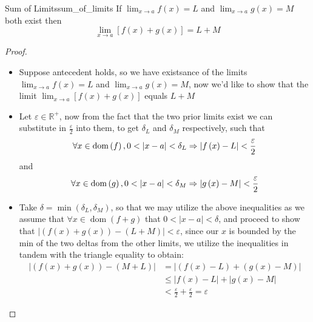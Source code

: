 \begin{proposition}{Sum of Limits}{sum_of_limits}
If $\lim _{x \rightarrow a} f(x)=L$ and $\lim _{x \rightarrow a} g(x)=M$ both
exist then
$$
\lim _{x \rightarrow a}[f(x)+g(x)]=L+M
$$
\end{proposition}
\begin{proof}
    \begin{itemize}
        \item Suppose antecedent holds, so we have existsance of the limits
            $\lim _{x \rightarrow a} f(x)=L$ and $\lim _{x \rightarrow a}
            g(x)=M$, now we'd like to show that the limit $\lim _{x \rightarrow
            a}[f(x)+g(x)]$ equals $L+M$ 
        \item Let $ \varepsilon \in \mathbb{R} ^{ +  }$, now from the fact that
            the two prior limits exist we can substitute in $
            \frac{\varepsilon}{2}  $ into them, to get $ \delta _{ L }  $ and $
            \delta _{ M }  $ respectively, such that 
        \[
        \forall x \in  \operatorname{ dom  }\left( f \right) , 0 < \left| x -  a
        \right| < \delta _{ L }  \Rightarrow \left| f\left( x \right) - L
        \right| < \frac{\varepsilon}{2}\\
        \]
        and
        \[
        \forall x \in  \operatorname{ dom  }\left( g \right) , 0 < \left| x -  a
        \right| < \delta _{ M }  \Rightarrow \left| g\left( x \right) - M
        \right| < \frac{\varepsilon}{2}\\
        \]
        \item Take $ \delta =  \min\left( \delta _{ L }  , \delta _{ M }
            \right)  $, so that we may utilize the above inequalities as we
            assume that $ \forall x \in  \operatorname{ dom  }\left( f +  g
            \right)  $ that $ 0 < \left| x -  a \right| < \delta  $, and proceed
            to show that $ \left| \left( f\left( x \right) +  g\left( x \right)
            \right) -  \left( L +  M \right) \right| < \varepsilon  $, since our
            $ x $ is bounded by the min of the two deltas from the other limits,
            we utilize the inequalities in tandem with the triangle equality to
            obtain: 
        \begin{align*}
            \left| \left( f\left( x \right)  +  g\left( x \right)  \right) -  \left(
            M +  L \right) \right| &=  \left| \left( f\left( x \right) -  L \right) +
            \left( g\left( x \right) -  M \right) \right|\\ 
                                   &\le \left| f\left( x \right) -  L \right| + \left| g\left( x \right) -
            M \right|\\ 
                                   &< \frac{\varepsilon }{2} +  \frac{\varepsilon }{2} =  \varepsilon 
        \end{align*}
    \end{itemize}
\end{proof}
